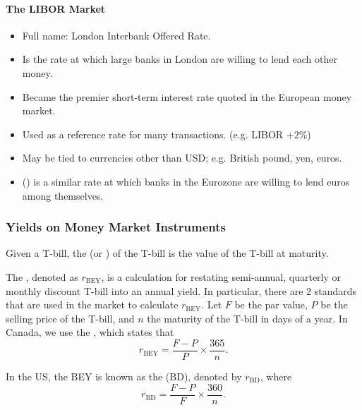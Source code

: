 \documentclass[notoc,notitlepage]{tufte-book}
\DeclareMathOperator{\BEY}{BEY}
\DeclareMathOperator{\BD}{BD}
\begin{document}
\paragraph{The LIBOR Market}\label{para:libor} 

\begin{itemize}
  \item Full name: London Interbank Offered Rate.
  \item Is the rate at which large banks in London are willing to lend each
    other money.
  \item Became the premier short-term interest rate quoted in the European money
    market.
  \item Used as a reference rate for many transactions. (e.g. LIBOR $+ 2\%$)
  \item May be tied to currencies other than USD;
    e.g. British pound, yen, euros.
  \item {} ()
    is a similar rate at which banks in the Eurozone are willing to lend
    euros among themselves.
\end{itemize}


\subsubsection{Yields on Money Market Instruments}%
\label{ssub:yields_on_money_market_instruments}

\begin{defn}\label{defn:par_value}\label{defn:face_value}
  Given a T-bill, the  (or )
  of the T-bill is the value of the T-bill at maturity.
\end{defn}

\begin{defn}\label{defn:bond_equivalent_yield}
  The , denoted as $r_{\BEY}$,
  is a calculation for restating semi-annual,
  quarterly or monthly discount T-bill into an annual yield.
  In particular, there are 2 standards that are used
  in the market to calculate $r_{\BEY}$.
  Let $F$ be the par value, $P$ be the selling price
  of the T-bill, and $n$ the maturity of the T-bill in days of a year.
  In Canada, we use the , which states that
  \begin{equation*}
    r_{\BEY} = \frac{F - P}{P} \times \frac{365}{n}.
  \end{equation*}

  In the US, the BEY is known as the  (BD),
  denoted by $r_{\BD}$, where
  \begin{equation*}
    r_{\BD} = \frac{F - P}{F} \times \frac{360}{n}.
  \end{equation*}
\end{defn}
\end{document}
